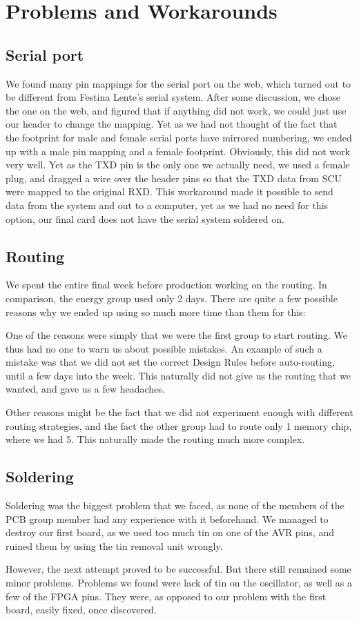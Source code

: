 \section {Problems and Workarounds}
\subsection{Serial port}
We found many pin mappings for the serial port on the web, which turned out to
be different from Festina Lente's serial system. After some discussion, we chose
the one on the web, and figured that if anything did not work, we could just
use our header to change the mapping.  Yet as we had not thought of the fact
that the footprint for male and female serial ports have mirrored numbering,
we ended up with a male pin mapping and a female footprint.  Obviously,
this did not work very well. Yet as the TXD pin is the only one we actually
need, we used a female plug, and dragged a wire over the header pins so that
the TXD data from SCU were mapped to the original RXD. This workaround made it
possible to send data from the system and out to a computer, yet as we had no
need for this option, our final card does not have the serial system soldered on.

\subsection{Routing}
We spent the entire final week before production working on the routing. In comparison, the energy group used only 2 days. There are quite a few possible reasons why we ended up using so much more time than them for this:

One of the reasons were simply that we were the first group to start routing. We thus had no one to warn us about possible mistakes. An example of such a mistake was that we did not set the correct Design Rules before auto-routing, until a few days into the week. This naturally did not give us the routing that we wanted, and gave us a few headaches.

Other reasons might be the fact that we did not experiment enough with different routing strategies, and the fact the other group had to route only 1 memory chip, where we had 5. This naturally made the routing much more complex.

\subsection{Soldering}
Soldering was the biggest problem that we faced, as none of the members of the
\ac{PCB} group member had any experience with it beforehand. We managed to
destroy our first board, as we used too much tin on one of the AVR pins, and
ruined them by using the tin removal unit wrongly.

However, the next attempt proved to be successful. But there still remained some
minor problems. Problems we found were lack of tin on the oscillator, as well as
a few of the \ac{FPGA} pins. They were, as opposed to our problem with the first
board, easily fixed, once discovered.
